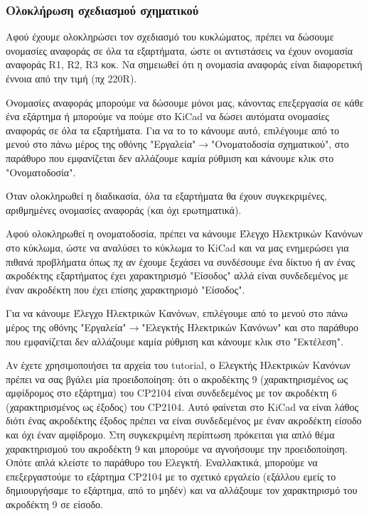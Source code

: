 \documentclass[a4paper]{article}
\begin{document}
\subsubsection{Ολοκλήρωση σχεδιασμού σχηματικού}
Αφού έχουμε ολοκληρώσει τον σχεδιασμό του κυκλώματος, πρέπει να δώσουμε ονομασίες αναφοράς σε όλα τα εξαρτήματα, ώστε οι αντιστάσεις να έχουν ονομασία αναφοράς R1, R2, R3 κοκ. Να σημειωθεί ότι η ονομασία αναφοράς είναι διαφορετική έννοια από την τιμή (πχ 220R). 

Ονομασίες αναφοράς μπορούμε να δώσουμε μόνοι μας, κάνοντας επεξεργασία σε κάθε ένα εξάρτημα ή μπορούμε να πούμε στο KiCad να δώσει αυτόματα ονομασίες αναφοράς σε όλα τα εξαρτήματα. Για να το το κάνουμε αυτό, επιλέγουμε από το μενού στο πάνω μέρος της οθόνης "Εργαλεία"$\rightarrow$"Ονοματοδοσία σχηματικού", στο παράθυρο που εμφανίζεται δεν αλλάζουμε καμία ρύθμιση και κάνουμε κλικ στο "Ονοματοδοσία".

\begin{figure}
  \begin{center}
    \label{fig:kicad-main}
  \end{center}
\end{figure}

Όταν ολοκληρωθεί η διαδικασία, όλα τα εξαρτήματα θα έχουν συγκεκριμένες, αριθμημένες ονομασίες αναφοράς (και όχι ερωτηματικά).

Αφού ολοκληρωθεί η ονοματοδοσία, πρέπει να κάνουμε Έλεγχο Ηλεκτρικών Κανόνων στο κύκλωμα, ώστε να αναλύσει το κύκλωμα το KiCad και να μας ενημερώσει για πιθανά προβλήματα όπως πχ αν έχουμε ξεχάσει να συνδέσουμε ένα δίκτυο ή αν ένας ακροδέκτης εξαρτήματος έχει χαρακτηρισμό "Είσοδος" αλλά είναι συνδεδεμένος με έναν ακροδέκτη που έχει επίσης χαρακτηρισμό "Είσοδος".

Για να κάνουμε Έλεγχο Ηλεκτρικών Κανόνων, επιλέγουμε από το μενού στο πάνω μέρος της οθόνης "Εργαλεία"$\rightarrow$"Ελεγκτής Ηλεκτρικών Κανόνων" και στο παράθυρο που εμφανίζεται δεν αλλάζουμε καμία ρύθμιση και κάνουμε κλικ στο "Εκτέλεση". 

Αν έχετε χρησιμοποιήσει τα αρχεία του tutorial, ο Ελεγκτής Ηλεκτρικών Κανόνων πρέπει να σας βγάλει μία προειδοποίηση: ότι ο ακροδέκτης 9 (χαρακτηρισμένος ως αμφίδρομος στο εξάρτημα) του CP2104 είναι συνδεδεμένος με τον ακροδέκτη 6 (χαρακτηρισμένος ως έξοδος) του CP2104. Αυτό φαίνεται στο KiCad να είναι λάθος διότι ένας ακροδέκτης έξοδος πρέπει να είναι συνδεδεμένος με έναν ακροδέκτη είσοδο και όχι έναν αμφίδρομο. Στη συγκεκριμένη περίπτωση πρόκειται για απλό θέμα χαρακτηρισμού του ακροδέκτη 9 και μπορούμε να αγνοήσουμε την προειδοποίηση. Οπότε απλά κλείστε το παράθυρο του Ελεγκτή.
Εναλλακτικά, μπορούμε να επεξεργαστούμε το εξάρτημα CP2104 με το σχετικό εργαλείο (εξάλλου εμείς το δημιουργήσαμε το εξάρτημα, από το μηδέν) και να αλλάξουμε τον χαρακτηρισμό του ακροδέκτη 9 σε είσοδο.
\end{document}

